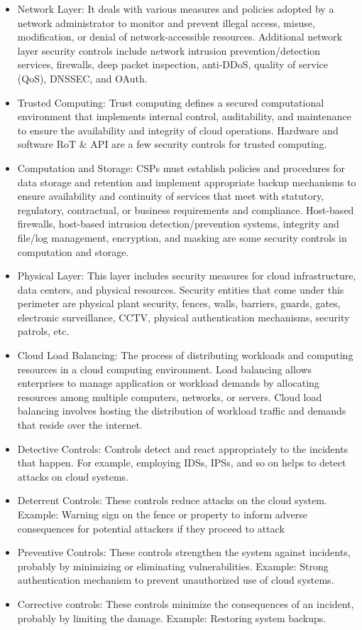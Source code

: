 \begin{itemize}
\begin{itemize}
        \item Network Layer: It deals with various measures and policies adopted by a network administrator to monitor and prevent illegal access, misuse, modification, or denial of network-accessible resources. Additional network layer security controls include network intrusion prevention/detection services, firewalls, deep packet inspection, anti-DDoS, quality of service (QoS), DNSSEC, and OAuth.
        \item Trusted Computing: Trust computing defines a secured computational environment that implements internal control, auditability, and maintenance to ensure the availability and integrity of cloud operations. Hardware and software RoT \& API are a few security controls for trusted computing.
        \item Computation and Storage: CSPs must establish policies and procedures for data storage and retention and implement appropriate backup mechanisms to ensure availability and continuity of services that meet with statutory, regulatory, contractual, or business requirements and compliance. Host-based firewalls, host-based intrusion detection/prevention systems, integrity and file/log management, encryption, and masking are some security controls in computation and storage.
        \item Physical Layer: This layer includes security measures for cloud infrastructure, data centers, and physical resources. Security entities that come under this perimeter are physical plant security, fences, walls, barriers, guards, gates, electronic surveillance, CCTV, physical authentication mechanisms, security patrols, etc.
        \item Cloud Load Balancing: The process of distributing workloads and computing resources in a cloud computing environment. Load balancing allows enterprises to manage application or workload demands by allocating resources among multiple computers, networks, or servers. Cloud load balancing involves hosting the distribution of workload traffic and demands that reside over the internet.
        \item Detective Controls: Controls detect and react appropriately to the incidents that happen. For example, employing IDSs, IPSs, and so on helps to detect attacks on cloud systems.
        \item Deterrent Controls: These controls reduce attacks on the cloud system. Example: Warning sign on the fence or property to inform adverse consequences for potential attackers if they proceed to attack
        \item Preventive Controls: These controls strengthen the system against incidents, probably by minimizing or eliminating vulnerabilities. Example: Strong authentication mechanism to prevent unauthorized use of cloud systems.
        \item Corrective controls: These controls minimize the consequences of an incident, probably by limiting the damage. Example: Restoring system backups.
    \end{itemize}
\end{itemize}


